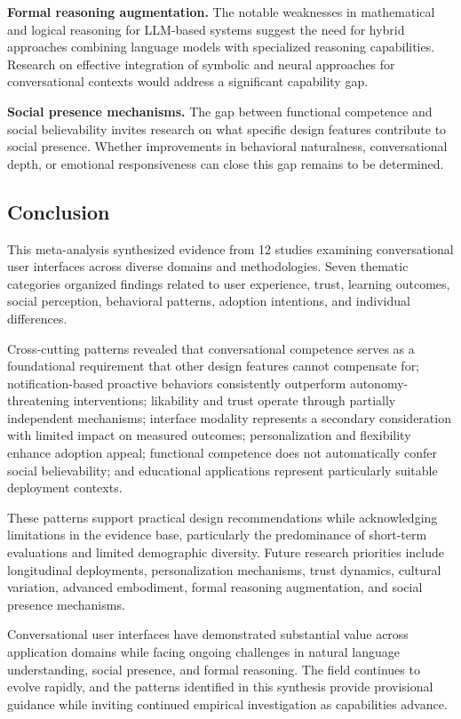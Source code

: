 \documentclass[manuscript,anonymous,sigconf]{acmart}
\begin{document}
\textbf{Formal reasoning augmentation.} The notable weaknesses in mathematical and logical reasoning for LLM-based systems \cite{A81} suggest the need for hybrid approaches combining language models with specialized reasoning capabilities. Research on effective integration of symbolic and neural approaches for conversational contexts would address a significant capability gap.

\textbf{Social presence mechanisms.} The gap between functional competence and social believability invites research on what specific design features contribute to social presence. Whether improvements in behavioral naturalness, conversational depth, or emotional responsiveness can close this gap remains to be determined.

\subsection{Conclusion}

This meta-analysis synthesized evidence from 12 studies examining conversational user interfaces across diverse domains and methodologies. Seven thematic categories organized findings related to user experience, trust, learning outcomes, social perception, behavioral patterns, adoption intentions, and individual differences.

Cross-cutting patterns revealed that conversational competence serves as a foundational requirement that other design features cannot compensate for; notification-based proactive behaviors consistently outperform autonomy-threatening interventions; likability and trust operate through partially independent mechanisms; interface modality represents a secondary consideration with limited impact on measured outcomes; personalization and flexibility enhance adoption appeal; functional competence does not automatically confer social believability; and educational applications represent particularly suitable deployment contexts.

These patterns support practical design recommendations while acknowledging limitations in the evidence base, particularly the predominance of short-term evaluations and limited demographic diversity. Future research priorities include longitudinal deployments, personalization mechanisms, trust dynamics, cultural variation, advanced embodiment, formal reasoning augmentation, and social presence mechanisms.

Conversational user interfaces have demonstrated substantial value across application domains while facing ongoing challenges in natural language understanding, social presence, and formal reasoning. The field continues to evolve rapidly, and the patterns identified in this synthesis provide provisional guidance while inviting continued empirical investigation as capabilities advance.
\end{document}
